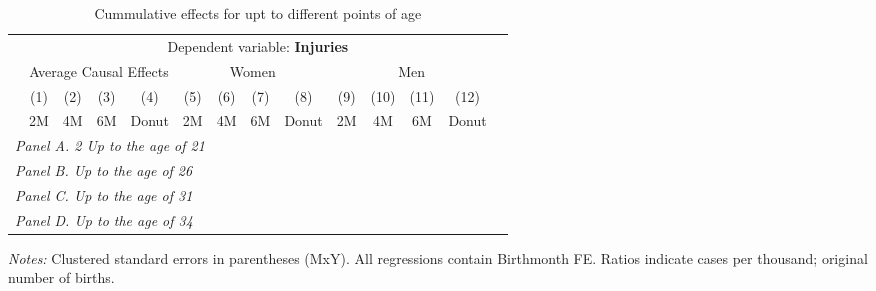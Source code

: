  \begin{table}[H] \begin{threeparttable} \centering \caption{Cummulative effects for upt to different points of age} {\def\sym#1{\ifmmode^{#1}\else\(^{#1}\)\fi} \begin{tabular}{l*{13}{c}} \toprule & \multicolumn{12}{c}{Dependent variable: \textbf{Injuries}} \\ \cmidrule(lr){2-13}
            &\multicolumn{4}{c}{Average Causal Effects}         &\multicolumn{4}{c}{Women}                          &\multicolumn{4}{c}{Men}                            \\\cmidrule(lr){2-5}\cmidrule(lr){6-9}\cmidrule(lr){10-13}
            &\multicolumn{1}{c}{(1)}&\multicolumn{1}{c}{(2)}&\multicolumn{1}{c}{(3)}&\multicolumn{1}{c}{(4)}&\multicolumn{1}{c}{(5)}&\multicolumn{1}{c}{(6)}&\multicolumn{1}{c}{(7)}&\multicolumn{1}{c}{(8)}&\multicolumn{1}{c}{(9)}&\multicolumn{1}{c}{(10)}&\multicolumn{1}{c}{(11)}&\multicolumn{1}{c}{(12)}\\
            &\multicolumn{1}{c}{2M}&\multicolumn{1}{c}{4M}&\multicolumn{1}{c}{6M}&\multicolumn{1}{c}{Donut}&\multicolumn{1}{c}{2M}&\multicolumn{1}{c}{4M}&\multicolumn{1}{c}{6M}&\multicolumn{1}{c}{Donut}&\multicolumn{1}{c}{2M}&\multicolumn{1}{c}{4M}&\multicolumn{1}{c}{6M}&\multicolumn{1}{c}{Donut}\\
\midrule
 \multicolumn{13}{l}{\emph{Panel A. 2 Up to the age of 21}} \\   \midrule\multicolumn{13}{l}{\emph{Panel B. Up to the age of 26}} \\   \midrule\multicolumn{13}{l}{\emph{Panel C. Up to the age of 31}} \\   \midrule\multicolumn{13}{l}{\emph{Panel D. Up to the age of 34}} \\   
\bottomrule \end{tabular} } \begin{tablenotes} \item \scriptsize \emph{Notes:} Clustered standard errors in parentheses (MxY). All regressions contain Birthmonth FE. Ratios indicate cases per thousand; original number of births. \end{tablenotes} \end{threeparttable} \end{table} 
